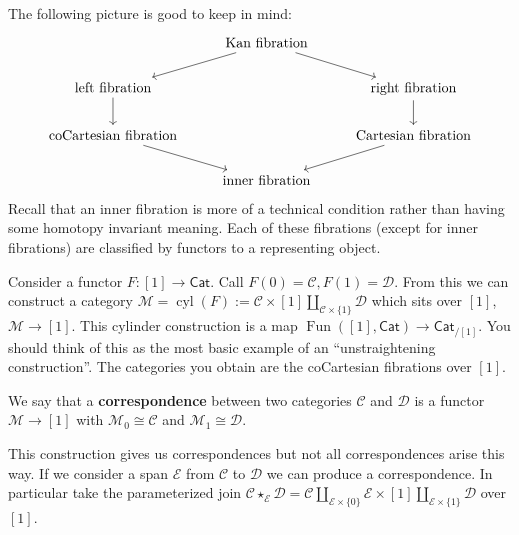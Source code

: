 \documentclass{amsart}
\DeclareMathOperator{\Fun}{Fun}
\DeclareMathOperator{\cyl}{cyl}
\begin{document}
The following picture is good to keep in mind:
\begin{equation*}
    \begin{tikzcd}
        & \text{Kan fibration}\ar[dl]\ar[dr] & \\
        \text{left fibration}\dar & & \text{right fibration}\dar \\
        \text{coCartesian fibration}\ar[dr] & & \text{Cartesian fibration}\ar[dl] \\
        & \text{inner fibration} &
    \end{tikzcd}
\end{equation*}
Recall that an inner fibration is more of a technical condition rather than
having some homotopy invariant meaning. Each of these fibrations (except for
inner fibrations) are classified by functors to a representing object.
\begin{example}
    Consider a functor $F:[1]\to \mathsf{Cat}$. Call $F(0)=\mathcal{C}, F(1)=\mathcal{D}$.
    From this we can construct a category $\mathcal{M}=\cyl(F) := \mathcal{C}\times[1]\coprod_{\mathcal{C}\times\{1\}}\mathcal{D}$
    which sits over $[1]$, $\mathcal{M}\to [1]$. This cylinder construction is
    a map $\Fun([1],\mathsf{Cat})\to \mathsf{Cat}_{/[1]}$. You should think of this as
    the most basic example of an ``unstraightening construction''. The categories you
    obtain are the coCartesian fibrations over $[1]$.
\end{example}
\begin{definition}
    We say that a \textbf{correspondence} between two categories $\mathcal{C}$ and $\mathcal{D}$
    is a functor $\mathcal{M}\to[1]$ with $\mathcal{M}_0\cong \mathcal{C}$ and $\mathcal{M}_1\cong \mathcal{D}$.
\end{definition}
This construction gives us correspondences but not all correspondences arise this way.
If we consider a span $\mathcal{E}$ from $\mathcal{C}$ to $\mathcal{D}$ we can produce a correspondence.
In particular take the parameterized join $\mathcal{C}\star_\mathcal{E}\mathcal{D}=\mathcal{C}\coprod_{\mathcal{E}\times\{0\}}\mathcal{E}\times[1]\coprod_{\mathcal{E}\times\{1\}}\mathcal{D}$ over $[1]$.
\end{document}
